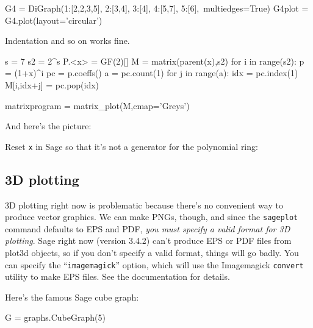 \documentclass{article}
\begin{document}
\begin{center}
\end{center}


\begin{sageblock}
G4 = DiGraph({1:[2,2,3,5], 2:[3,4], 3:[4], 4:[5,7], 5:[6]},\
             multiedges=True)
G4plot = G4.plot(layout='circular')
\end{sageblock}


Indentation and so on works fine.
\begin{sageblock}
 s     = 7
 s2    = 2^s
 P.<x> = GF(2)[]
 M     = matrix(parent(x),s2)
 for i in range(s2):
    p  = (1+x)^i
    pc = p.coeffs()
    a  = pc.count(1)
    for j in range(a):
        idx        = pc.index(1)
        M[i,idx+j] = pc.pop(idx)

 matrixprogram = matrix_plot(M,cmap='Greys')
\end{sageblock}
And here's the picture:


Reset \texttt{x} in Sage so that it's not a generator for the polynomial
ring: \sage{var('x')}

\subsection{3D plotting}

3D plotting right now is problematic because there's no convenient way
to produce vector graphics. We can make PNGs, though, and since the
\verb|sageplot| command defaults to EPS and PDF, \emph{you must specify
a valid format for 3D plotting}. Sage right now (version 3.4.2) can't
produce EPS or PDF files from plot3d objects, so if you don't specify a
valid format, things will go badly. You can specify the
``\texttt{imagemagick}'' option, which will use the Imagemagick
\texttt{convert} utility to make EPS files. See the documentation for
details.

Here's the famous Sage cube graph:

\begin{sageblock}
  G = graphs.CubeGraph(5)
\end{sageblock}

\end{document}
